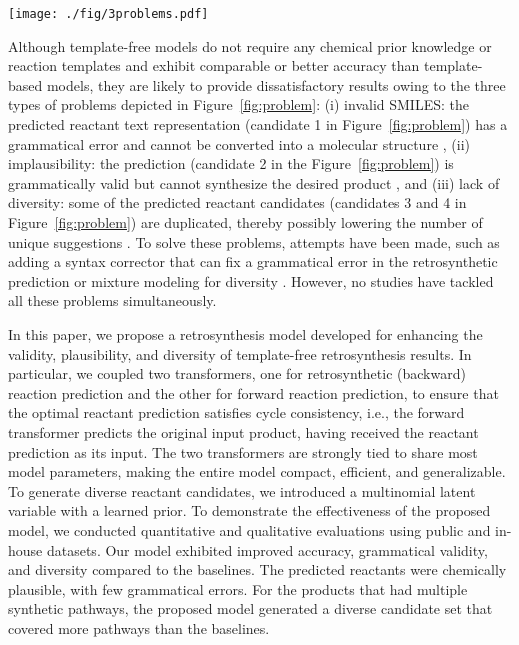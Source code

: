 \documentclass[journal=jacsat,manuscript=article]{achemso}
\begin{document}
	
	\begin{figure*}
		\centering
		\texttt{[image: ./fig/3problems.pdf]}
		\caption{Example of the three types of problems in template-free retorysynthesis}
		\label{fig:problem}
	\end{figure*}
	
	Although template-free models do not require any chemical prior knowledge or reaction templates and exhibit comparable or better accuracy than template-based models, they are likely to provide dissatisfactory results owing to the three types of problems depicted in Figure~\ref{fig:problem}: (i) invalid SMILES: the predicted reactant text representation (candidate 1 in Figure~\ref{fig:problem}) has a grammatical error and cannot be converted into a molecular structure \cite{liu2017retrosynthetic, zheng2019predicting}, (ii) implausibility: the prediction (candidate 2 in the Figure~\ref{fig:problem}) is grammatically valid but cannot synthesize the desired product \cite{liu2017retrosynthetic}, and (iii) lack of diversity: some of the predicted reactant candidates (candidates 3 and 4 in Figure~\ref{fig:problem}) are duplicated, thereby possibly lowering the number of unique suggestions \cite{chen2019learning}. To solve these problems, attempts have been made, such as adding a syntax corrector that can fix a grammatical error in the retrosynthetic prediction \cite{zheng2019predicting} or mixture modeling for diversity \cite{chen2019learning}. However, no studies have tackled all these problems simultaneously.

	In this paper, we propose a retrosynthesis model developed for enhancing the validity, plausibility, and diversity of template-free retrosynthesis results. In particular, we coupled two transformers, one for retrosynthetic (backward) reaction prediction and the other for forward reaction prediction, to ensure that the optimal reactant prediction satisfies cycle consistency, i.e., the forward transformer predicts the original input product, having received the reactant prediction as its input. The two transformers are strongly tied to share most model parameters, making the entire model compact, efficient, and generalizable. To generate diverse reactant candidates, we introduced a multinomial latent variable with a learned prior. To demonstrate the effectiveness of the proposed model, we conducted quantitative and qualitative evaluations using public and in-house datasets. Our model exhibited improved accuracy, grammatical validity, and diversity compared to the baselines. The predicted reactants were chemically plausible, with few grammatical errors. For the products that had multiple synthetic pathways, the proposed model generated a diverse candidate set that covered more pathways than the baselines.
	
\end{document}
